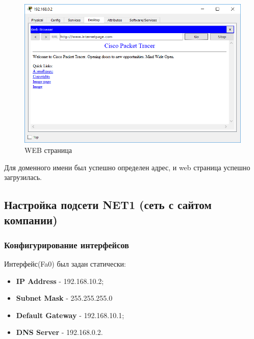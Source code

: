 \begin{figure}[H]
  \centering
  \includegraphics[width=.8\textwidth]{img/net0_0_2__5}
  \caption{WEB страница}
\end{figure}
Для доменного имени был успешно определен адрес, и web страница успешно загрузилась.
\subsection{Настройка подсети NET1 (сеть с сайтом компании)}
\subsubsection{Конфигурирование интерфейсов}
Интерфейс(Fa0) был задан статически:
\begin{itemize}
\item \textbf{IP Address} - 192.168.10.2;
\item \textbf{Subnet Mask} - 255.255.255.0
\item \textbf{Default Gateway} - 192.168.10.1;
\item \textbf{DNS Server} - 192.168.0.2.
\end{itemize}
